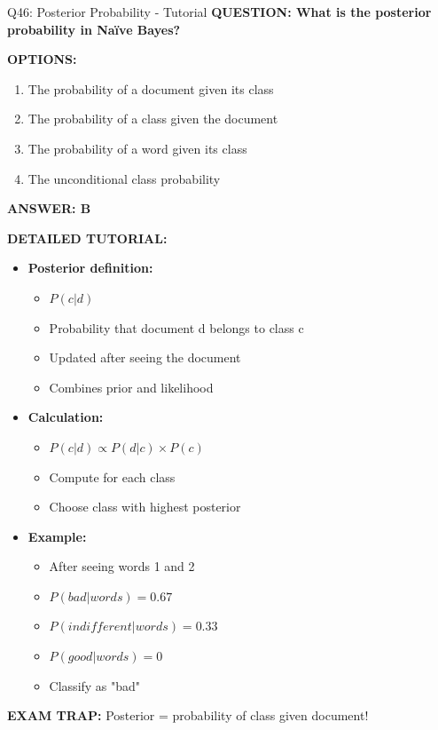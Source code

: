 \documentclass[8pt]{beamer}
\begin{document}
	\begin{frame}{Q46: Posterior Probability - Tutorial}
		\fontsize{6.5}{7.5}\selectfont
		\textbf{QUESTION: What is the posterior probability in Naïve Bayes?}
		
		\vspace{0.1cm}
		\textbf{OPTIONS:}
		\begin{enumerate}
			\item The probability of a document given its class
			\item The probability of a class given the document
			\item The probability of a word given its class
			\item The unconditional class probability
		\end{enumerate}
		
		\vspace{0.1cm}
		\textcolor{myblue}{\textbf{ANSWER: B}}
		
		\vspace{0.1cm}
		\textbf{DETAILED TUTORIAL:}
		\begin{itemize}
			\item \textbf{Posterior definition:}
			\begin{itemize}
				\item $P(c|d)$
				\item Probability that document d belongs to class c
				\item Updated after seeing the document
				\item Combines prior and likelihood
			\end{itemize}
			\item \textbf{Calculation:}
			\begin{itemize}
				\item $P(c|d) \propto P(d|c) \times P(c)$
				\item Compute for each class
				\item Choose class with highest posterior
			\end{itemize}
			\item \textbf{Example:}
			\begin{itemize}
				\item After seeing words 1 and 2
				\item $P(bad|words) = 0.67$
				\item $P(indifferent|words) = 0.33$
				\item $P(good|words) = 0$
				\item Classify as "bad"
			\end{itemize}
		\end{itemize}
		
		\textcolor{myred}{\textbf{EXAM TRAP:}} Posterior = \textcolor{myblue}{probability of class given document}!
	\end{frame}
	
\end{document}
